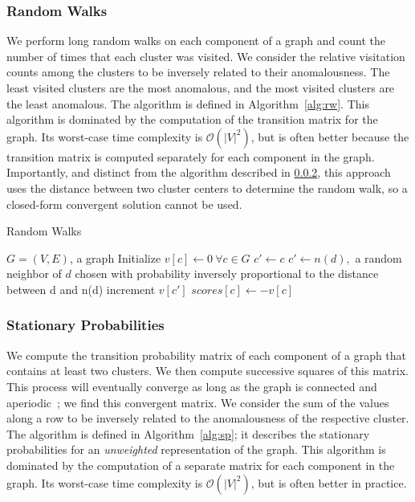 \subsubsection{Random Walks}
We perform long random walks on each component of a graph and count the number of times that each cluster was visited.
We consider the relative visitation counts among the clusters to be inversely related to their anomalousness.
The least visited clusters are the most anomalous, and the most visited clusters are the least anomalous.
The algorithm is defined in Algorithm~\ref{alg:rw}.
This algorithm is dominated by the computation of the transition matrix for the graph.
Its worst-case time complexity is $\mathcal{O}(|V|^2)$, but is often better because the transition matrix is computed separately for each component in the graph.
Importantly, and distinct from the algorithm described in \ref{subsubsec:methods:individual-algorithms:sp}, this approach uses the distance between two cluster centers to determine the random walk, so a closed-form convergent solution cannot be used.


\begin{algorithm}[h]
    \caption{Random Walks}
    \label{alg:rw}
\begin{algorithmic}[1]
    \REQUIRE $G = (V,E)$, a graph
    \STATE Initialize $v[c] \gets 0 \ \forall c \in G$
        \STATE $c' \gets c$
            \STATE $c' \gets n(d),$ a random neighbor of $d$ chosen with probability inversely proportional to the distance between d and n(d)
            \STATE increment $v[c']$
        \ENDFOR
    \ENDFOR
        \STATE $scores[c] \gets -v[c]$
    \ENDFOR
\end{algorithmic}
\end{algorithm}

\subsubsection{Stationary Probabilities}
\label{subsubsec:methods:individual-algorithms:sp}
We compute the transition probability matrix of each component of a graph that contains at least two clusters.
We then compute successive squares of this matrix.
This process will eventually converge as long as the graph is connected and aperiodic~\cite{levin2017markov}; we find this convergent matrix.
We consider the sum of the values along a row to be inversely related to the anomalousness of the respective cluster.
The algorithm is defined in Algorithm~\ref{alg:sp}; it describes the stationary probabilities for an \emph{unweighted} representation of the graph.
This algorithm is dominated by the computation of a separate matrix for each component in the graph.
Its worst-case time complexity is $\mathcal{O}(|V|^2)$, but is often better in practice.

